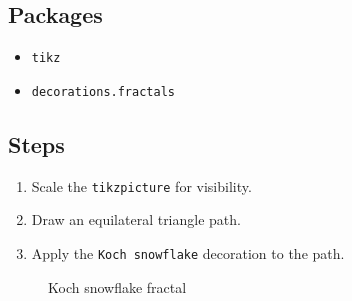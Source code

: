 \documentclass{article}
\begin{document}
\subsection*{Packages}
\begin{itemize}
    \item \texttt{tikz}
    \item \texttt{decorations.fractals}
\end{itemize}
\subsection*{Steps}
\begin{enumerate}
    \item Scale the \texttt{tikzpicture} for visibility.
    \item Draw an equilateral triangle path.
    \item Apply the \texttt{Koch snowflake} decoration to the path.
\end{enumerate}
\begin{figure}[h!]
    \centering
    \caption{Koch snowflake fractal}
\end{figure}
\end{document}
